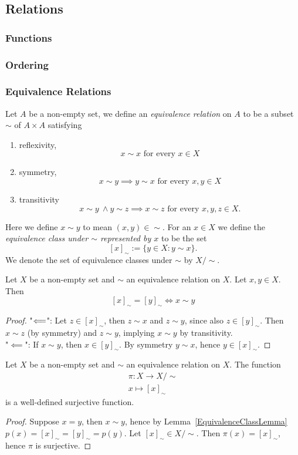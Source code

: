 \subsection{Relations}
\subsubsection{Functions}
\subsubsection{Ordering}
\subsubsection{Equivalence Relations}
\begin{definition}
    Let $A$ be a non-empty set, we define an \textit{equivalence relation} on $A$ to be a subset $\sim$ of $A\times A$ satisfying 
    \begin{enumerate}
        \item reflexivity,
        $$x\sim x \text{ for every } x \in X$$
        \item symmetry,
        $$x \sim y \implies y\sim x \text{ for every } x,y\in X$$
        \item transitivity
        $$x \sim y\ \wedge y\sim z \implies x\sim z \text{ for every } x,y,z\in X.$$
    \end{enumerate}
    Here we define $x\sim y$ to mean $(x,y)\in \sim$. For an $x\in X$ we define the \textit{equivalence class under $\sim$ represented by $x$} to be the set 
    $$[x]_\sim:= \{y\in X : y\sim x\}.$$
    We denote the set of equivalence classes under $\sim$ by $X/\sim$.
\end{definition}
\begin{lemma}\label{EquivalenceClassLemma}
    Let $X$ be a non-empty set and $\sim$ an equivalence relation on $X$. Let $x,y\in X$. Then 
    $$[x]_\sim = [y]_\sim \iff x\sim y$$
\end{lemma}
\begin{proof}
    "$\Longleftarrow$": Let $z\in [x]_\sim$, then $z\sim x$ and $z\sim y$, since also $z\in [y]_\sim$. Then $x\sim z$ (by symmetry) and $z\sim y$, implying $x\sim y$ by transitivity.\\
    "$\impliedby$": If $x\sim y$, then $x\in [y]_\sim$. By symmetry $y\sim x$, hence $y\in [x]_\sim$. 
\end{proof}
\begin{lemma}\label{CanonicalSurjection}
    Let $X$ be a non-empty set and $\sim$ an equivalence relation on $X$. The function
    \begin{gather*}
        \pi : X\rightarrow X/\sim\\
        x\mapsto [x]_\sim
    \end{gather*}
    is a well-defined surjective function.
\end{lemma}
\begin{proof}
    Suppose $x=y$, then $x\sim y$, hence by Lemma~\ref{EquivalenceClassLemma} $p(x)=[x]_\sim=[y]_\sim=p(y)$. Let $[x]_\sim \in X/\sim$. Then $\pi(x) =[x]_\sim$, hence $\pi$ is surjective.
\end{proof}
